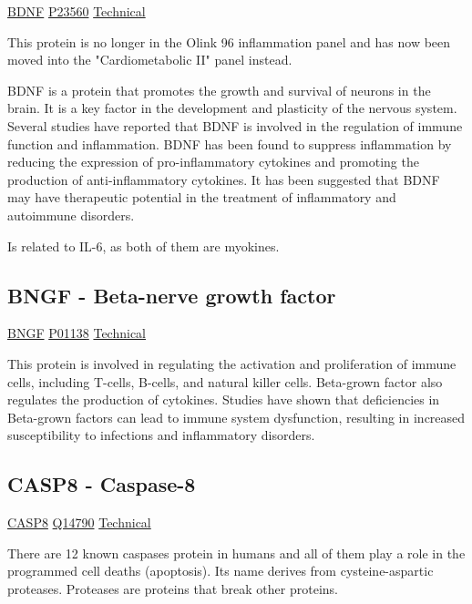\href{https://en.wikipedia.org/wiki/Brain-derived_neurotrophic_factor}{BDNF}
\href{http://www.uniprot.org/uniprot/P23560}{P23560}
\href{https://olink.com/products-services/explore/protein/?proteinID=OID30373}{Technical}

This protein is no longer in the Olink 96 inflammation panel and has now been moved into the "Cardiometabolic II" panel instead.

BDNF is a protein that promotes the growth and survival of neurons in the brain. It is a key factor in the development and plasticity of the nervous system. Several studies have reported that BDNF is involved in the regulation of immune function and inflammation. BDNF has been found to suppress inflammation by reducing the expression of pro-inflammatory cytokines and promoting the production of anti-inflammatory cytokines. It has been suggested that BDNF may have therapeutic potential in the treatment of inflammatory and autoimmune disorders.

Is related to IL-6, as both of them are myokines.

\subsection{BNGF - Beta-nerve growth factor}

\href{https://en.wikipedia.org/wiki/Nerve_growth_factor}{BNGF}
\href{http://www.uniprot.org/uniprot/P01138}{P01138}
\href{https://olink.com/products-services/target/protein/?assayID=5058}{Technical}

This protein is involved in regulating the activation and proliferation of immune cells, including T-cells, B-cells, and natural killer cells. Beta-grown factor also regulates the production of cytokines. Studies have shown that deficiencies in Beta-grown factors can lead to immune system dysfunction, resulting in increased susceptibility to infections and inflammatory disorders.

\subsection{CASP8 - Caspase-8}
\label{in:olink-casp8}

\href{https://en.wikipedia.org/wiki/Caspase\_8}{CASP8}
\href{http://www.uniprot.org/uniprot/Q14790}{Q14790}
\href{https://olink.com/products-services/target/protein/?assayID=5122}{Technical}

There are 12 known caspases protein in humans and all of them play a role in the programmed cell deaths (apoptosis). Its name derives from cysteine-aspartic proteases. Proteases are proteins that break other proteins.

